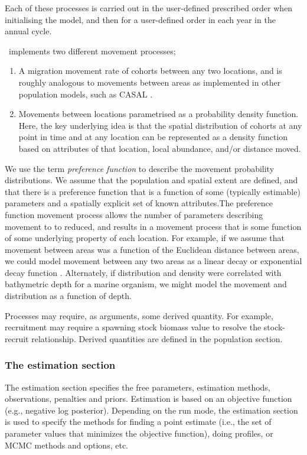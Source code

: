 Each of these processes is carried out in the user-defined prescribed order when initialising the model, and then for a user-defined order in each year in the annual cycle.

\SPM\ implements two different movement processes;
\begin{enumerate}
	\item  A migration movement rate of cohorts between any two locations, and is roughly analogous to movements between areas as implemented in other population models, such as CASAL \citep{1388}. 
	\item Movements between locations parametrised as a probability density function. Here, the key underlying idea is that the spatial distribution of cohorts at any point in time and at any location can be represented as a density function based on attributes of that location, local abundance, and/or distance moved. 
\end{enumerate}

We use the term \emph{preference function} \citep{1366,1367} to describe the movement probability distributions. We assume that the population and spatial extent are defined, and that there is a preference function that is a function of some (typically estimable) parameters and a spatially explicit set of known attributes.The preference function movement process allows the number of parameters describing movement to to reduced, and results in a movement process that is some function of some underlying property of each location. For example, if we assume that movement between areas was a function of the Euclidean distance between areas, we could model movement between any two areas as a linear decay or exponential decay function \citep{1366}. Alternately, if distribution and density were correlated with bathymetric depth for a marine organism, we might model the movement and distribution as a function of depth. 

Processes may require, as arguments, some derived quantity. For example, recruitment may require a spawning stock biomass value to resolve the stock-recruit relationship. Derived quantities are defined in the population section.

\subsubsection{The estimation section}

The estimation section specifies the free parameters, estimation methods, observations, penalties and priors. Estimation is based on an objective function (e.g., negative log posterior). Depending on the run mode, the estimation section is used to specify the methods for finding a point estimate (i.e., the set of parameter values that minimizes the objective function), doing profiles, or MCMC methods and options, etc.

